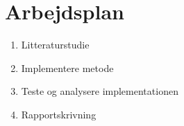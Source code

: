 \documentclass[12pt]{article}
\begin{document}
\section*{Arbejdsplan}
\begin{enumerate}
    \item Litteraturstudie 
    \item Implementere metode
    \item Teste og analysere implementationen
    \item Rapportskrivning
\end{enumerate}

\begin{gantt}{5}{16}
    \begin{ganttitle}
    \end{ganttitle}
\end{gantt}
\end{document}
